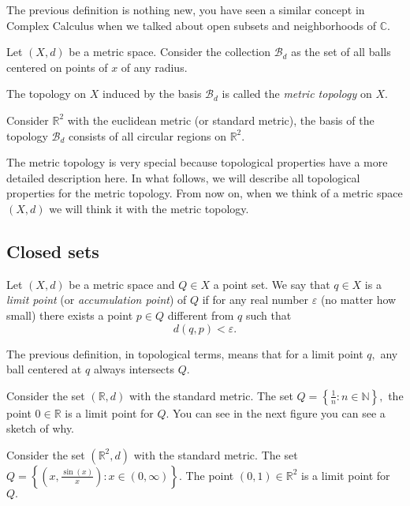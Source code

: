\documentclass[
	fontsize=10pt, %
	twoside=false, %
	secnumdepth=1, %
]{kaobook}
\begin{document}
The previous definition is nothing new, you have seen a similar concept in Complex Calculus when we talked about open subsets and neighborhoods of $\mathbb{C}.$

\begin{definition}
Let $(X,d)$ be a metric space. Consider the collection $\mathcal{B}_d$ as the set of all balls centered on points of $x$ of any radius. 

The topology on $X$ induced by the basis $\mathcal{B}_d$ is called the \emph{metric topology} on $X.$
\end{definition}

\begin{example}
Consider $\mathbb{R}^2$ with the euclidean metric (or standard metric), the basis of the topology $\mathcal{B}_d$ consists of all circular regions on $\mathbb{R}^2.$
\end{example}

The metric topology is very special because topological properties have a more detailed description here. In what follows, we will describe all topological properties for the metric topology. From now on, when we think of a metric space $(X,d)$ we will think it with the metric topology.

\subsection{Closed sets}

\begin{definition}
Let $(X,d)$ be a metric space and $Q\in X$ a point set. We say that $q\in X$ is a \emph{limit point} (or \emph{accumulation point}) of $Q$ if for any real number $\varepsilon$ (no matter how small) there exists a point $p\in Q$ different from $q$ such that $$d(q,p)<\varepsilon.$$
\end{definition}

The previous definition, in topological terms, means that for a limit point $q,$ any ball centered at $q$ always intersects $Q$.

\begin{example}
Consider the set $(\mathbb{R},d)$ with the standard metric. The set $Q=\left\{\frac{1}{n}: n\in\mathbb{N}\right\},$ the point $0\in\mathbb{R}$ is a limit point for $Q.$ You can see in the next figure you can see a sketch of why.
\end{example}

\begin{example}
Consider the set $(\mathbb{R}^2,d)$ with the standard metric. The set $Q=\left\{\left(x,\frac{\sin(x)}{x}\right): x\in(0,\infty)\right\}.$ The point $(0,1)\in \mathbb{R}^2$ is a limit point for $Q.$
\end{example}
\end{document}
